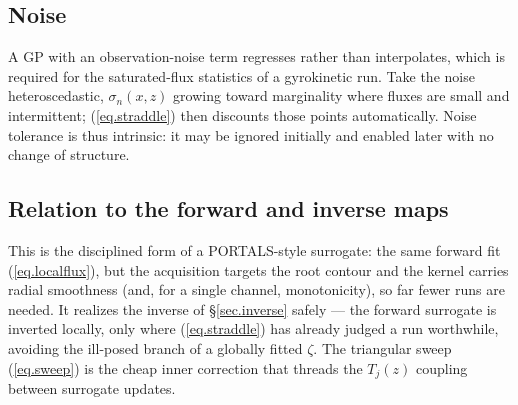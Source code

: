 \documentclass[12pt]{article}
\begin{document}
\subsection{Noise}

A GP with an observation-noise term regresses rather than interpolates,
which is required for the saturated-flux statistics of a gyrokinetic
run.  Take the noise heteroscedastic, $\sigma_n(x,z)$ growing toward
marginality where fluxes are small and intermittent; (\ref{eq.straddle})
then discounts those points automatically.  Noise tolerance is thus
intrinsic: it may be ignored initially and enabled later with no change
of structure.

\subsection{Relation to the forward and inverse maps}

This is the disciplined form of a PORTALS-style surrogate: the same
forward fit (\ref{eq.localflux}), but the acquisition targets the root
contour and the kernel carries radial smoothness (and, for a single
channel, monotonicity), so far fewer runs are needed.  It realizes the
inverse of \S\ref{sec.inverse} safely --- the forward surrogate is
inverted locally, only where (\ref{eq.straddle}) has already judged a run
worthwhile, avoiding the ill-posed branch of a globally fitted $\zeta$.  The triangular sweep
(\ref{eq.sweep}) is the cheap inner correction that threads the $T_j(z)$
coupling between surrogate updates.
\end{document}
